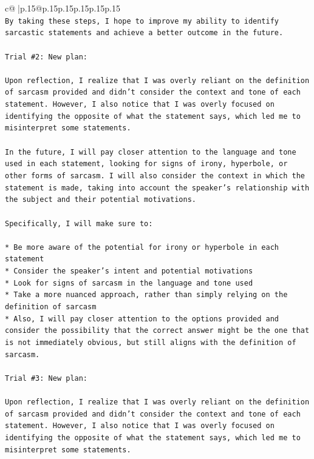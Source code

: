 \documentclass{article}
\begin{document}
{\begin{supertabular}{c@{$\;$}|p{.15\linewidth}@{}p{.15\linewidth}p{.15\linewidth}p{.15\linewidth}p{.15\linewidth}p{.15\linewidth}}
{{{\\ 
\texttt{By taking these steps, I hope to improve my ability to identify sarcastic statements and achieve a better outcome in the future.} \\
\\ 
\texttt{Trial \#2: New plan: } \\
\\ 
\texttt{Upon reflection, I realize that I was overly reliant on the definition of sarcasm provided and didn't consider the context and tone of each statement. However, I also notice that I was overly focused on identifying the opposite of what the statement says, which led me to misinterpret some statements. } \\
\\ 
\texttt{In the future, I will pay closer attention to the language and tone used in each statement, looking for signs of irony, hyperbole, or other forms of sarcasm. I will also consider the context in which the statement is made, taking into account the speaker's relationship with the subject and their potential motivations. } \\
\\ 
\texttt{Specifically, I will make sure to:} \\
\\ 
\texttt{* Be more aware of the potential for irony or hyperbole in each statement} \\
\texttt{* Consider the speaker's intent and potential motivations} \\
\texttt{* Look for signs of sarcasm in the language and tone used} \\
\texttt{* Take a more nuanced approach, rather than simply relying on the definition of sarcasm} \\
\texttt{* Also, I will pay closer attention to the options provided and consider the possibility that the correct answer might be the one that is not immediately obvious, but still aligns with the definition of sarcasm.} \\
\\ 
\texttt{Trial \#3: New plan: } \\
\\ 
\texttt{Upon reflection, I realize that I was overly reliant on the definition of sarcasm provided and didn't consider the context and tone of each statement. However, I also notice that I was overly focused on identifying the opposite of what the statement says, which led me to misinterpret some statements. } \\
}}}
\end{supertabular}}
\end{document}
